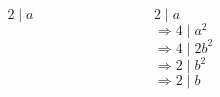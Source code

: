 \begin{frame}
  \begin{columns}
    \begin{column}{0.3\textwidth}
      \color{gmitblue} \fontsize{30}{10}
      \[2 \mid a\]
    \end{column}
    {\color{gmitgrey!30}\vrule{}} \hspace{0.1\textwidth}
    \begin{column}{0.5\textwidth}
      $2 \mid a$ \\[8mm]
      $\Rightarrow 4 \mid a^2$ \\[8mm]
      $\Rightarrow 4 \mid 2b^2$ \\[8mm]
      $\Rightarrow 2 \mid b^2$ \\[8mm]
      $\Rightarrow 2 \mid b$
    \end{column}
  \end{columns}
\end{frame}
